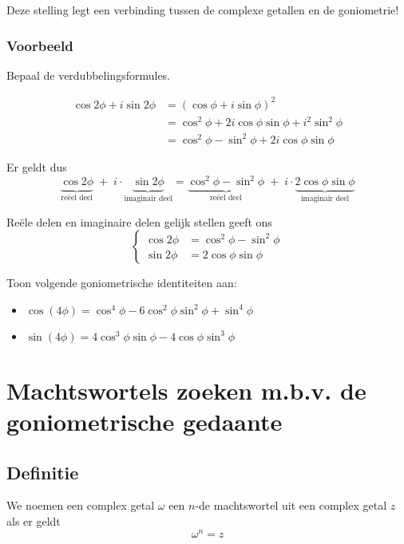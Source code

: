\documentclass[12pt,twoside,a4paper]{article}
\begin{document}
Deze stelling legt een verbinding tussen de complexe getallen en de goniometrie!

\subsubsection*{Voorbeeld}

Bepaal de verdubbelingsformules.

\begin{align*}
  \cos 2\phi + i \sin 2\phi &= (\cos \phi + i \sin \phi)^2\\
                      &= \cos^2 \phi + 2i\cos\phi\sin\phi + i^2\sin^2\phi\\
                      &= \cos^2\phi - \sin^2\phi + 2i\cos\phi\sin\phi
\end{align*}

Er geldt dus
\[ \underbrace{\cos 2\phi}_{\text{reëel deel}} \;+ \;i \cdot \underbrace{\sin 2\phi}_{\text{imaginair deel}}
  = \underbrace{\cos^2\phi - \sin^2\phi}_{\text{reëel deel}} \; + \; i \cdot \underbrace{2\cos\phi\sin\phi}_{\text{imaginair deel}} \]

Reële delen en imaginaire delen gelijk stellen geeft ons
\[
  \begin{cases}
    \cos 2\phi &= \cos^2\phi - \sin^2\phi \\
    \sin 2\phi &= 2 \cos\phi \sin\phi
  \end{cases}
\]

\begin{oefening}
  Toon volgende goniometrische identiteiten aan:
  \begin{itemize}
  \item $\cos(4\phi) = \cos^4\phi - 6 \cos^2\phi \sin^2\phi + \sin^4\phi $
  \item $\sin(4\phi) = 4\cos^3\phi \sin\phi - 4 \cos\phi \sin^3\phi $
  \end{itemize}
\end{oefening}

\pagebreak

\section{Machtswortels zoeken m.b.v. de goniometrische gedaante}

\subsection{Definitie}

We noemen een complex getal $\omega$ een $n$-de machtswortel uit een complex getal $z$ als er geldt
\[\omega^n = z\]
\end{document}
